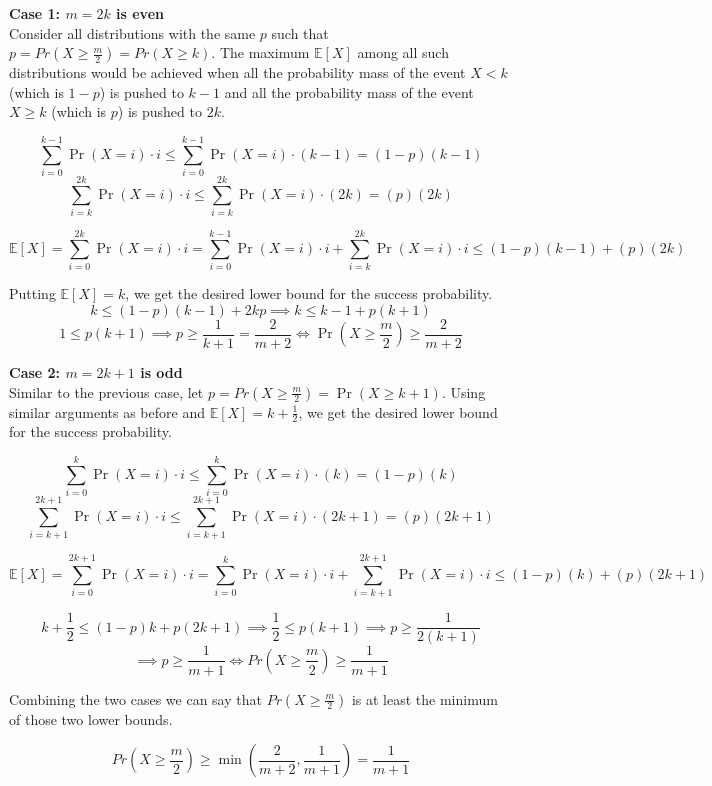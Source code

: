 \noindent\textbf{Case 1: $m=2k$ is even}\\

\noindent Consider all distributions with the same $p$ such that $p=Pr(X \ge \frac{m}{2})=Pr(X \ge k)$. The maximum $\mathbb E[X]$ 
among all such distributions would be achieved when all the probability mass of the event $X<k$ (which is $1-p$) 
is pushed to $k-1$ and all the probability mass of the event $X\ge k$ (which is $p$) is pushed to $2k$.


\[
\sum_{i=0}^{k-1} \Pr(X=i)\cdot i \le \sum_{i=0}^{k-1} \Pr(X=i)\cdot (k-1) = (1-p)(k-1)
\]
\[
\sum_{i=k}^{2k} \Pr(X=i)\cdot i \le \sum_{i=k}^{2k} \Pr(X=i)\cdot (2k) = (p)(2k)
\]

\[
\mathbb{E}[X] 
= 
\sum_{i=0}^{2k} \Pr(X=i)\cdot i 
= 
\sum_{i=0}^{k-1} \Pr(X=i)\cdot i + \sum_{i=k}^{2k} \Pr(X=i)\cdot i 
\le 
(1-p)(k-1) + (p)(2k)
\]

Putting $\mathbb E[X]=k$, we get the desired lower bound for the success probability.
\[
k \le (1-p)(k-1)+2kp
\implies
k \le k-1+p(k+1)
\]
\[
1 \le p(k+1)
\implies
p \ge \frac{1}{k+1}=\frac{2}{m+2}
\iff
\Pr\!\left(X\ge \frac{m}{2}\right)\ge \frac{2}{m+2}
\]

\noindent\textbf{Case 2: $m=2k+1$ is odd}\\

\noindent Similar to the previous case, let $p=Pr(X\ge \frac{m}{2})=\Pr(X\ge k+1)$. Using similar
arguments as before and $\mathbb E[X]=k+\frac{1}{2}$, we get the desired lower bound for the success probability.

\[
\sum_{i=0}^{k} \Pr(X=i)\cdot i \le \sum_{i=0}^{k} \Pr(X=i)\cdot (k) = (1-p)(k)
\]
\[
\sum_{i=k+1}^{2k+1} \Pr(X=i)\cdot i \le \sum_{i=k+1}^{2k+1} \Pr(X=i)\cdot (2k+1) = (p)(2k+1)
\]

\[
\mathbb{E}[X] 
= 
\sum_{i=0}^{2k+1} \Pr(X=i)\cdot i 
= 
\sum_{i=0}^{k} \Pr(X=i)\cdot i + \sum_{i=k+1}^{2k+1} \Pr(X=i)\cdot i 
\le 
(1-p)(k) + (p)(2k+1)
\]

\[
k+\frac{1}{2} \le (1-p)k+p(2k+1) \implies \frac{1}{2}\le p(k+1) \implies p\ge \frac{1}{2(k+1)}
\]
\[
\implies
p \ge \frac{1}{m+1}
\iff Pr(X\ge \frac{m}{2})\ge \frac{1}{m+1}
\]


\vspace{2em}
Combining the two cases we can say that $Pr(X\ge \frac{m}{2})$ is at least the minimum of those two lower bounds.

\[
Pr(X \ge \frac{m}{2}) \ge \min\!\left(\frac{2}{m+2}, \frac{1}{m+1}\right) = \frac{1}{m+1}
\]


